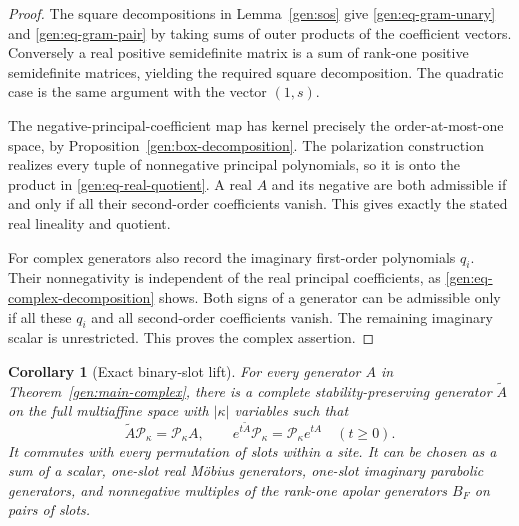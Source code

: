 \documentclass[reqno]{amsart}
\newtheorem{corollary}[theorem]{Corollary}
\theoremstyle{definition}
\theoremstyle{remark}
\begin{document}
\begin{proof}
The square decompositions in Lemma~\ref{gen:sos} give
\eqref{gen:eq-gram-unary} and \eqref{gen:eq-gram-pair} by
taking sums of outer products of the coefficient vectors.
Conversely a real positive semidefinite matrix is a sum
of rank-one positive semidefinite matrices, yielding the
required square decomposition.
The quadratic case is the same argument with the vector
\((1,s)\).

The negative-principal-coefficient map has kernel precisely
the order-at-most-one space, by
Proposition~\ref{gen:box-decomposition}.
The polarization construction realizes every tuple of
nonnegative principal polynomials, so it is onto the product
in \eqref{gen:eq-real-quotient}.
A real \(A\) and its negative are both admissible if and only
if all their second-order coefficients vanish.
This gives exactly the stated real lineality and quotient.

For complex generators also record the imaginary first-order
polynomials \(q_i\).
Their nonnegativity is independent of the real principal
coefficients, as
\eqref{gen:eq-complex-decomposition} shows.
Both signs of a generator can be admissible only if all these
\(q_i\) and all second-order coefficients vanish.
The remaining imaginary scalar is unrestricted.
This proves the complex assertion.
\end{proof}

\begin{corollary}[Exact binary-slot lift]
\label{gen:slot-lift}
For every generator \(A\) in Theorem~\ref{gen:main-complex},
there is a complete stability-preserving generator
\(\widetilde A\) on the full multiaffine space with
\(|\kappa|\) variables such that
\begin{equation}
 \widetilde A\mathcal P_\kappa=\mathcal P_\kappa A,
 \qquad
 e^{t\widetilde A}\mathcal P_\kappa
          =\mathcal P_\kappa e^{tA}\quad(t\geq0).
 \label{gen:eq-exact-lift}
\end{equation}
It commutes with every permutation of slots within a site.
It can be chosen as a sum of a scalar, one-slot real
M\"obius generators, one-slot imaginary parabolic generators,
and nonnegative multiples of the rank-one apolar generators
\(B_F\) on pairs of slots.
\end{corollary}
\end{document}
